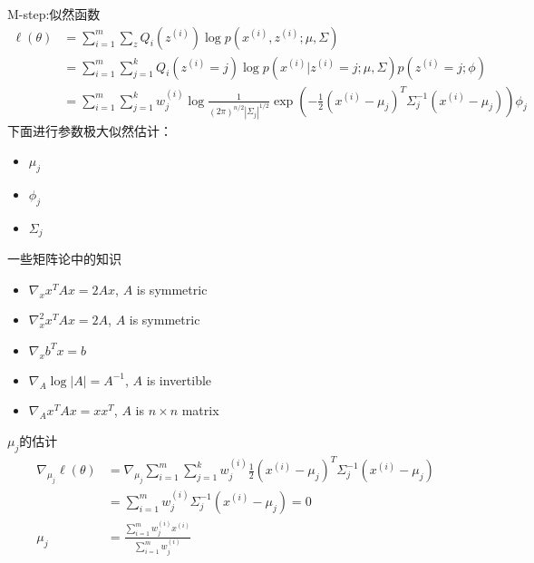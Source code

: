 \documentclass[noindent]{beamer}
\begin{document}
\begin{frame}
\alert{M-step:}似然函数
\begin{equation}
\begin{split}
    \ell(\theta) &= \sum_{i=1}^{m}  \sum _{z}Q_{i}(z^{(i)}) \log p(x^{(i)},z^{(i)}; \mu , \Sigma ) \\
              &= \sum_{i=1}^{m}  \sum _{j=1}^{k}Q_{i}(z^{(i)}=j) \log p(x^{(i)}|z^{(i)}=j; \mu , \Sigma ) p(z^{(i)}=j; \phi ) \\
              &= \sum_{i=1}^{m}  \sum _{j=1}^{k}w^{(i)}_{j} \log \frac{1}{(2\pi)^{n/2}| \Sigma _j|^{1/2}} \exp(-\frac{1}{2}(x^{(i)}-\mu_j)^T\Sigma_j^{-1}(x^{(i)}-\mu_j))\phi_j 
\end{split}
\end{equation}
下面进行参数极大似然估计：
\begin{itemize}
\item $\mu_j$
\item $\phi_j$
\item $\Sigma_j$
\end{itemize}
\end{frame}

\begin{frame}{一些矩阵论中的知识}
\begin{itemize}
\item $ \nabla_x x^T A x = 2Ax$, $A$ is symmetric
\item $ \nabla_x^2 x^TAx = 2A$, $A$ is symmetric
\item $ \nabla_x b^T x = b$
\item $ \nabla_A \log|A| = A^{-1}$, $A$ is invertible
\item $ \nabla_A x^T A x = x x^T$, $A$ is $n \times n$ matrix
\end{itemize}
\end{frame}

\begin{frame}{$\mu_j$的估计}
\begin{equation}
    \begin{split}
       \nabla _{\mu_j} \ell(\theta) &= \nabla _{\mu_j} \sum_{i=1}^m  \sum_{j=1}^k w_j^{(i)}\frac{1}{2}(x^{(i)}-\mu_j)^T  \Sigma _j^{-1}(x^{(i)}-\mu_j) \\
                                  &=  \sum_{i=1}^m w_j^{(i)} \Sigma_j^{-1}(x^{(i)}-\mu_j) = 0\\
                            \mu_j &= \frac{\sum_{i=1}^m w_j^{(i)}x^{(i)}}{\sum_{i=1}^m w_j^{(i)}}
    \end{split}
\end{equation}
\end{frame}
\end{document}
